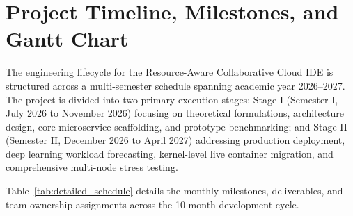 \documentclass[12pt,a4paper]{report}
\begin{document}
\section{Project Timeline, Milestones, and Gantt Chart}
The engineering lifecycle for the Resource-Aware Collaborative Cloud IDE is structured across a multi-semester schedule spanning academic year 2026--2027. The project is divided into two primary execution stages: Stage-I (Semester I, July 2026 to November 2026) focusing on theoretical formulations, architecture design, core microservice scaffolding, and prototype benchmarking; and Stage-II (Semester II, December 2026 to April 2027) addressing production deployment, deep learning workload forecasting, kernel-level live container migration, and comprehensive multi-node stress testing.

Table~\ref{tab:detailed_schedule} details the monthly milestones, deliverables, and team ownership assignments across the 10-month development cycle.
\end{document}
